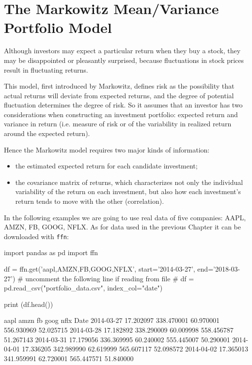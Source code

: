\section{The Markowitz Mean/Variance Portfolio Model}
\label{the-markowitz-meanvariance-portfolio-model}

Although investors may expect a particular return when they buy a stock, they may be disappointed or pleasantly surprised, because fluctuations in stock prices result in fluctuating returns. 

This model, first introduced by Markowitz, defines risk as the possibility that actual returns will deviate from expected returns, and the degree of potential fluctuation determines the degree of risk.
So it assumes that an investor has two considerations when constructing an investment portfolio: expected return and variance in return (i.e. measure of risk or of the variability in realized return around the expected return). 

Hence the Markowitz model requires two major kinds of information:

\begin{itemize}
\tightlist
\item
  the estimated expected return for each candidate investment;
\item
  the covariance matrix of returns, which characterizes not only the 
  individual variability of the return on each investment, 
  but also how each investment's return tends to move with the other (correlation).
\end{itemize}

In the following examples we are going to use real data
of five companies:  AAPL, AMZN, FB, GOOG, NFLX. As for data used in the previous Chapter
it can be downloaded with \texttt{ffn}:

\begin{ipython}
import pandas as pd
import ffn

df = ffn.get('aapl,AMZN,FB,GOOG,NFLX', start='2014-03-27', end='2018-03-27')
# uncomment the following line if reading from file
# df = pd.read_csv("portfolio_data.csv", index_col="date")

print (df.head())
\end{ipython}
\begin{ioutput}
                aapl       amzn        fb       goog      nflx
Date
2014-03-27 17.202097 338.470001 60.970001 556.930969 52.025715
2014-03-28 17.182892 338.290009	60.009998 558.456787 51.267143
2014-03-31 17.179056 336.369995	60.240002 555.445007 50.290001
2014-04-01 17.336205 342.989990	62.619999 565.607117 52.098572
2014-04-02 17.365013 341.959991	62.720001 565.447571 51.840000
\end{ioutput}

